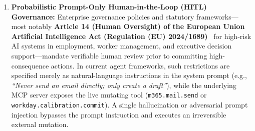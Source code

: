 \documentclass[conference,10pt]{IEEEtran}
\begin{document}
\begin{enumerate}
    \item \textbf{Probabilistic Prompt-Only Human-in-the-Loop (HITL) Governance:} Enterprise governance policies and statutory frameworks---most notably \textbf{Article 14 (Human Oversight) of the European Union Artificial Intelligence Act (Regulation (EU) 2024/1689)}~\cite{euaiact2024} for high-risk AI systems in employment, worker management, and executive decision support---mandate verifiable human review prior to committing high-consequence actions. In current agent frameworks, such restrictions are specified merely as natural-language instructions in the system prompt (e.g., \emph{``Never send an email directly; only create a draft''}), while the underlying MCP server exposes the live mutating tool (\texttt{m365.mail.send} or \texttt{workday.calibration.commit}). A single hallucination or adversarial prompt injection bypasses the prompt instruction and executes an irreversible external mutation.
\end{enumerate}
\end{document}

